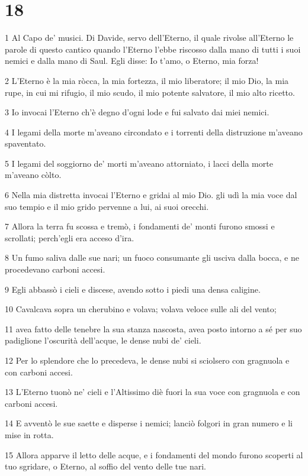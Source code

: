 \chapter{18}

\par 1 Al Capo de' musici. Di Davide, servo dell'Eterno, il quale rivolse all'Eterno le parole di questo cantico quando l'Eterno l'ebbe riscosso dalla mano di tutti i suoi nemici e dalla mano di Saul. Egli disse: Io t'amo, o Eterno, mia forza!
\par 2 L'Eterno è la mia ròcca, la mia fortezza, il mio liberatore; il mio Dio, la mia rupe, in cui mi rifugio, il mio scudo, il mio potente salvatore, il mio alto ricetto.
\par 3 Io invocai l'Eterno ch'è degno d'ogni lode e fui salvato dai miei nemici.
\par 4 I legami della morte m'aveano circondato e i torrenti della distruzione m'aveano spaventato.
\par 5 I legami del soggiorno de' morti m'aveano attorniato, i lacci della morte m'aveano còlto.
\par 6 Nella mia distretta invocai l'Eterno e gridai al mio Dio.  gli udì la mia voce dal suo tempio e il mio grido pervenne a lui, ai suoi orecchi.
\par 7 Allora la terra fu scossa e tremò, i fondamenti de' monti furono smossi e scrollati; perch'egli era acceso d'ira.
\par 8 Un fumo saliva dalle sue nari; un fuoco consumante gli usciva dalla bocca, e ne procedevano carboni accesi.
\par 9 Egli abbassò i cieli e discese, avendo sotto i piedi una densa caligine.
\par 10 Cavalcava sopra un cherubino e volava; volava veloce sulle ali del vento;
\par 11 avea fatto delle tenebre la sua stanza nascosta, avea posto intorno a sé per suo padiglione l'oscurità dell'acque, le dense nubi de' cieli.
\par 12 Per lo splendore che lo precedeva, le dense nubi si sciolsero con gragnuola e con carboni accesi.
\par 13 L'Eterno tuonò ne' cieli e l'Altissimo diè fuori la sua voce con gragnuola e con carboni accesi.
\par 14 E avventò le sue saette e disperse i nemici; lanciò folgori in gran numero e li mise in rotta.
\par 15 Allora apparve il letto delle acque, e i fondamenti del mondo furono scoperti al tuo sgridare, o Eterno, al soffio del vento delle tue nari.
